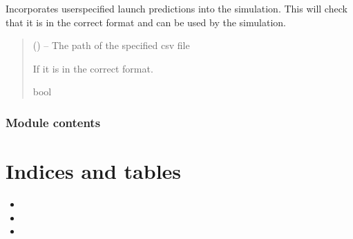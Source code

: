 \documentclass[letterpaper,10pt,english]{sphinxmanual}
\begin{document}
\begin{fulllineitems}
\label{\detokenize{fspsim:fspsim.simulate.set_future_constellations}}
\pysigstartsignatures
{}
\pysigstopsignatures
\sphinxAtStartPar
Incorporates user\sphinxhyphen{}specified launch predictions into the simulation.
This will check that it is in the correct format
and can be used by the simulation.
\begin{quote}\begin{description}
\sphinxAtStartPar
{} () – The path of the specified csv file

\sphinxAtStartPar
If it is in the correct format.

\sphinxAtStartPar
bool

\end{description}\end{quote}

\end{fulllineitems}



\subsection{Module contents}
\label{\detokenize{fspsim:module-fspsim}}\label{\detokenize{fspsim:module-contents}}

\chapter{Indices and tables}
\label{\detokenize{index:indices-and-tables}}\begin{itemize}
\item {} 
\sphinxAtStartPar
{}

\item {} 
\sphinxAtStartPar
{}

\item {} 
\sphinxAtStartPar
{}

\end{itemize}
\end{document}

